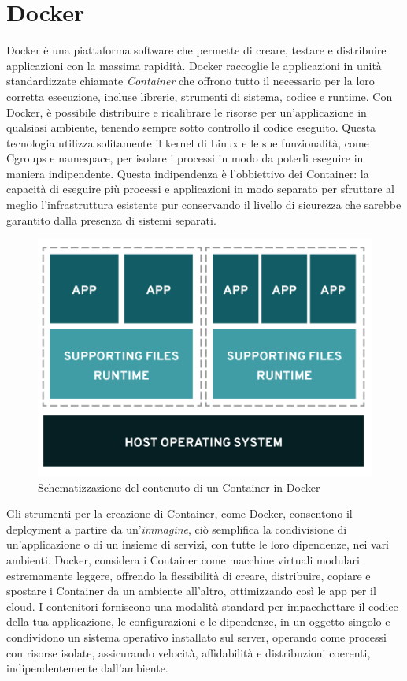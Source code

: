 \section{Docker}
Docker è una piattaforma software che permette di creare, testare e distribuire applicazioni con la massima rapidità. Docker raccoglie 
le applicazioni in unità standardizzate chiamate \textit{Container} che offrono tutto il necessario per la loro corretta esecuzione, incluse librerie, 
strumenti di sistema, codice e runtime. Con Docker, è possibile distribuire e ricalibrare le risorse per un'applicazione in qualsiasi ambiente, 
tenendo sempre sotto controllo il codice eseguito.\hfill\break
Questa tecnologia utilizza solitamente il kernel di Linux e le sue funzionalità, come Cgroups e namespace, per isolare i processi in modo da poterli 
eseguire in maniera indipendente. Questa indipendenza è l'obbiettivo dei Container: la capacità di eseguire più processi e applicazioni in 
modo separato per sfruttare al meglio l'infrastruttura esistente pur conservando il livello di sicurezza che sarebbe garantito dalla 
presenza di sistemi separati.
%
\begin{figure}[ht!]
    \centering
    \includegraphics[scale=0.7]{images/Docker_Config_Container.png}
    \caption{Schematizzazione del contenuto di un Container in Docker}
    \label{fig:DCC}
\end{figure}
\hfill\break
Gli strumenti per la creazione di Container, come Docker, consentono il deployment a partire da un'\textit{immagine}, ciò semplifica la condivisione di 
un'applicazione o di un insieme di servizi, con tutte le loro dipendenze, nei vari ambienti.
Docker, considera i Container come macchine virtuali modulari estremamente leggere, offrendo la flessibilità di creare, distribuire, 
copiare e spostare i Container da un ambiente all'altro, ottimizzando così le app per il cloud.\hfill\break
I contenitori forniscono una modalità standard per impacchettare il codice della tua applicazione, le configurazioni e le dipendenze, in un oggetto singolo e 
condividono un sistema operativo installato sul server, operando come processi con risorse isolate, assicurando velocità, affidabilità e distribuzioni coerenti, 
indipendentemente dall’ambiente.
%
